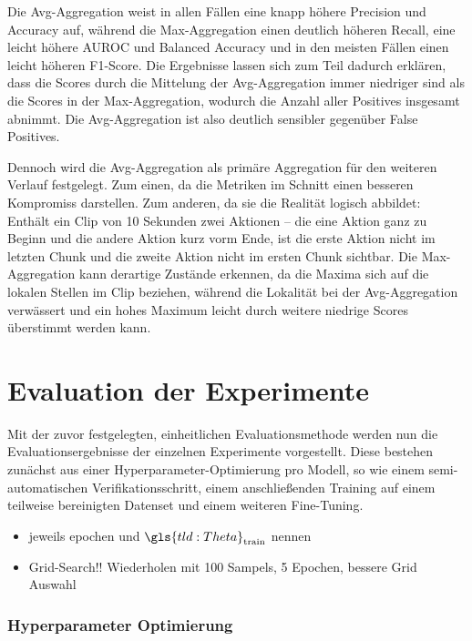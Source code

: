 Die Avg-Aggregation weist in allen Fällen eine knapp höhere Precision und Accuracy auf, während die Max-Aggregation einen deutlich höheren Recall, eine leicht höhere AUROC und Balanced Accuracy und in den meisten Fällen einen leicht höheren F1-Score.
Die Ergebnisse lassen sich zum Teil dadurch erklären, dass die Scores durch die Mittelung der Avg-Aggregation immer niedriger sind als die Scores in der Max-Aggregation, wodurch die Anzahl aller Positives insgesamt abnimmt.
Die Avg-Aggregation ist also deutlich sensibler gegenüber False Positives.

Dennoch wird die Avg-Aggregation als primäre Aggregation für den weiteren Verlauf festgelegt.
Zum einen, da die Metriken im Schnitt einen besseren Kompromiss darstellen.
Zum anderen, da sie die Realität logisch abbildet:
Enthält ein Clip von 10 Sekunden zwei Aktionen -- die eine Aktion ganz zu Beginn und die andere Aktion kurz vorm Ende, ist die erste Aktion nicht im letzten Chunk und die zweite Aktion nicht im ersten Chunk sichtbar.
Die Max-Aggregation kann derartige Zustände erkennen, da die Maxima sich auf die lokalen Stellen im Clip beziehen, während die Lokalität bei der Avg-Aggregation verwässert und ein hohes Maximum leicht durch weitere niedrige Scores überstimmt werden kann.

\section{Evaluation der Experimente}

Mit der zuvor festgelegten, einheitlichen Evaluationsmethode werden nun die Evaluationsergebnisse der einzelnen Experimente vorgestellt.
Diese bestehen zunächst aus einer Hyperparameter-Optimierung pro Modell, so wie einem semi-automatischen Verifikationsschritt, einem anschließenden Training auf einem teilweise bereinigten Datenset und einem weiteren Fine-Tuning.

\begin{tcolorbox}[title=Todo]
    \begin{itemize}
        \item jeweils epochen und $\gls{tld:Theta}_\text{train}$ nennen
        \item Grid-Search!! Wiederholen mit 100 Sampels, 5 Epochen, bessere Grid Auswahl
    \end{itemize}
\end{tcolorbox}

\subsubsection{Hyperparameter Optimierung}

